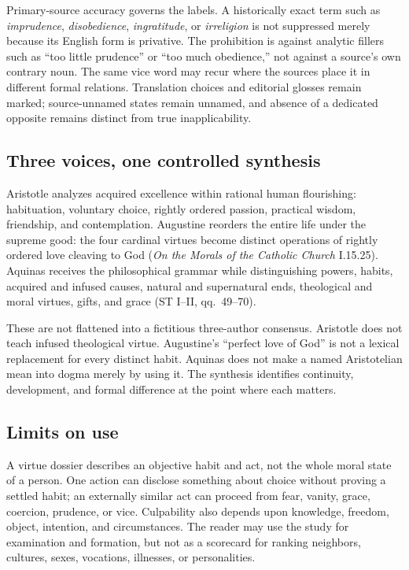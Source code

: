 {Primary-source accuracy governs the labels. A historically exact term such as \emph{imprudence}, \emph{disobedience}, \emph{ingratitude}, or \emph{irreligion} is not suppressed merely because its English form is privative. The prohibition is against analytic fillers such as “too little prudence” or “too much obedience,” not against a source's own contrary noun. The same vice word may recur where the sources place it in different formal relations. Translation choices and editorial glosses remain marked; source-unnamed states remain unnamed, and absence of a dedicated opposite remains distinct from true inapplicability.

\subsection{Three voices, one controlled synthesis}

Aristotle analyzes acquired excellence within rational human flourishing: habituation, voluntary choice, rightly ordered passion, practical wisdom, friendship, and contemplation. Augustine reorders the entire life under the supreme good: the four cardinal virtues become distinct operations of rightly ordered love cleaving to God (\emph{On the Morals of the Catholic Church} I.15.25). Aquinas receives the philosophical grammar while distinguishing powers, habits, acquired and infused causes, natural and supernatural ends, theological and moral virtues, gifts, and grace (ST I--II, qq.~49--70).

These are not flattened into a fictitious three-author consensus. Aristotle does not teach infused theological virtue. Augustine's “perfect love of God” is not a lexical replacement for every distinct habit. Aquinas does not make a named Aristotelian mean into dogma merely by using it. The synthesis identifies continuity, development, and formal difference at the point where each matters.

\subsection{Limits on use}

A virtue dossier describes an objective habit and act, not the whole moral state of a person. One action can disclose something about choice without proving a settled habit; an externally similar act can proceed from fear, vanity, grace, coercion, prudence, or vice. Culpability also depends upon knowledge, freedom, object, intention, and circumstances. The reader may use the study for examination and formation, but not as a scorecard for ranking neighbors, cultures, sexes, vocations, illnesses, or personalities.

}
